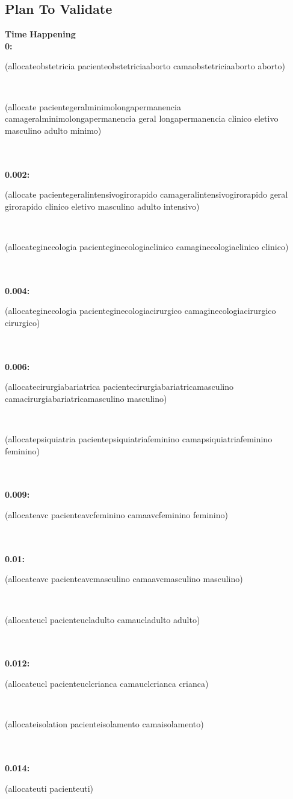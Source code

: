\documentclass[a4paper,12pt]{article}
\newcommand{\headingtimehappening}{{\bf Time} \qquad \= {\bf Happening}\\[0.8ex]}
\newcommand{\atime}[1]{{\bf #1:}}
\newcommand{\action}[1]{{\sf #1}}
\newcommand{\listrow}[1]{\begin{minipage}[t]{11.5cm} #1 \end{minipage}}
\begin{document}
\subsection{Plan To Validate}
\begin{tabbing}
\headingtimehappening 
\atime{0}  \> \listrow{\action{(allocateobstetricia pacienteobstetriciaaborto camaobstetriciaaborto aborto)}}\\ \> \listrow{\action{(allocate pacientegeralminimolongapermanencia camageralminimolongapermanencia geral longapermanencia clinico eletivo masculino adulto minimo)}}\\
\\\atime{0.002}  \> \listrow{\action{(allocate pacientegeralintensivogirorapido camageralintensivogirorapido geral girorapido clinico eletivo masculino adulto intensivo)}}\\ \> \listrow{\action{(allocateginecologia pacienteginecologiaclinico camaginecologiaclinico clinico)}}\\
\\\atime{0.004}  \> \listrow{\action{(allocateginecologia pacienteginecologiacirurgico camaginecologiacirurgico cirurgico)}}\\
\\\atime{0.006}  \> \listrow{\action{(allocatecirurgiabariatrica pacientecirurgiabariatricamasculino camacirurgiabariatricamasculino masculino)}}\\ \> \listrow{\action{(allocatepsiquiatria pacientepsiquiatriafeminino camapsiquiatriafeminino feminino)}}\\
\\\atime{0.009}  \> \listrow{\action{(allocateavc pacienteavcfeminino camaavcfeminino feminino)}}\\
\\\atime{0.01}  \> \listrow{\action{(allocateavc pacienteavcmasculino camaavcmasculino masculino)}}\\ \> \listrow{\action{(allocateucl pacienteucladulto camaucladulto adulto)}}\\
\\\atime{0.012}  \> \listrow{\action{(allocateucl pacienteuclcrianca camauclcrianca crianca)}}\\ \> \listrow{\action{(allocateisolation pacienteisolamento camaisolamento)}}\\
\\\atime{0.014}  \> \listrow{\action{(allocateuti pacienteuti)}}\\
\end{tabbing}
\end{document}
